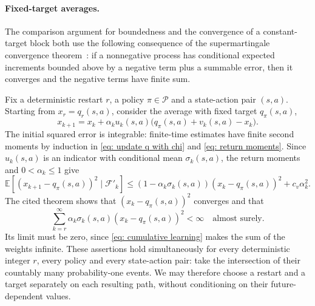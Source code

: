 \hfill \BlackBox




\paragraph{Fixed-target averages.}
\label{app: fixed target averages}
The comparison argument for boundedness and the convergence of a constant-target block both use the following consequence of the supermartingale convergence theorem~\citep[Proposition~4.2]{Bertsekas1996Neuro-DynamicProgramming}: if a nonnegative process has conditional expected increments bounded above by a negative term plus a summable error, then it converges and the negative terms have finite sum.

Fix a deterministic restart $r$, a policy $\pi\in\mathcal P$ and a state-action pair $(s,a)$.
Starting from $x_r=q_r(s,a)$, consider the average with fixed target $q_\pi(s,a)$,
\[
x_{k+1}=x_k+\alpha_k u_k(s,a)\big(q_\pi(s,a)+v_k(s,a)-x_k\big).
\]
The initial squared error is integrable: finite-time estimates have finite second moments by induction in \eqref{eq: update q with chi} and \eqref{eq: return moments}.
Since $u_k(s,a)$ is an indicator with conditional mean $\sigma_k(s,a)$, the return moments and $0<\alpha_k\le1$ give
\[
\mathbb E\!\left[(x_{k+1}-q_\pi(s,a))^2\mid\mathcal F'_k\right]
\le (1-\alpha_k\sigma_k(s,a))(x_k-q_\pi(s,a))^2+c_v\alpha_k^2.
\]
The cited theorem shows that $(x_k-q_\pi(s,a))^2$ converges and that
\[
\sum_{k=r}^{\infty}\alpha_k\sigma_k(s,a)(x_k-q_\pi(s,a))^2<\infty
\quad\text{almost surely}.
\]
Its limit must be zero, since \eqref{eq: cumulative learning} makes the sum of the weights infinite.
These assertions hold simultaneously for every deterministic integer $r$, every policy and every state-action pair: take the intersection of their countably many probability-one events. We may therefore choose a restart and a target separately on each resulting path, without conditioning on their future-dependent values.

